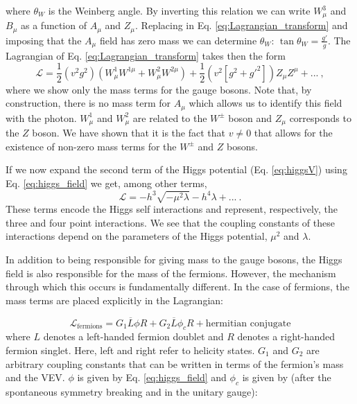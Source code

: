 where $\theta_W$ is the Weinberg angle.
By inverting this relation we can write $W^3_{\mu}$ and $B_{\mu}$ as a function of $A_{\mu}$ and $Z_{\mu}$. Replacing in Eq. \ref{eq:Lagrangian_transform} and imposing that the $A_{\mu}$ field has zero mass we can determine $\theta_W$: $\tan\theta_W=\frac{g'}{g}$. The Lagrangian of Eq. \ref{eq:Lagrangian_transform} takes then the form
\begin{equation}
	\mathcal{L}=\frac{1}{2}\left(v^2g^2\right)\left(W^1_{\mu}W^{1\mu}+W^2_{\mu}W^{2\mu}\right)+\frac{1}{2}\left(v^2\left[g^2+g'^2\right]\right)Z_{\mu}Z^{\mu}+...~,
\end{equation}
where we show only the mass terms for the gauge bosons. Note that, by construction, there is no mass term for $A_{\mu}$ which allows us to identify this field with the photon. $W^1_{\mu}$ and $W^2_{\mu}$ are related to the $W^{\pm}$ boson and $Z_{\mu}$ corresponds to the $Z$ boson. We have shown that it is the fact that $v\neq0$ that allows for the existence of non-zero mass terms for the $W^{\pm}$ and $Z$ bosons.

If we now expand the second term of the Higgs potential (Eq. \ref{eq:higgsV}) using Eq. \ref{eq:higgs_field} we get, among other terms,
\begin{equation}
\mathcal{L}=-h^3\sqrt{-\mu^2 \lambda} - h^4\lambda+...~.
\label{eq:higgs_couplings}
\end{equation}
These terms encode the Higgs self interactions and represent, respectively, the three and four point interactions. We see that the coupling constants of these interactions depend on the parameters of the Higgs potential, $\mu^2$ and $\lambda$.

In addition to being responsible for giving mass to the gauge bosons, the Higgs field is also responsible for the mass of the fermions. However, the mechanism through which this occurs is fundamentally different. In the case of fermions, the mass terms are placed explicitly in the Lagrangian:

\begin{equation}
	\mathcal{L}_{\text{fermions}}=G_1 \overline{L}\phi R + G_2 \overline{L}\phi_c R + \text{hermitian conjugate}
	\label{eq:fermions_mass}
\end{equation}
where $L$ denotes a left-handed fermion doublet and $R$ denotes a right-handed fermion singlet. Here, left and right refer to helicity states. $G_1$ and $G_2$ are arbitrary coupling constants that can be written in terms of the fermion's mass and the VEV. $\phi$ is given by Eq. \ref{eq:higgs_field} and $\phi_c$ is given by (after the spontaneous symmetry breaking and in the unitary gauge):


